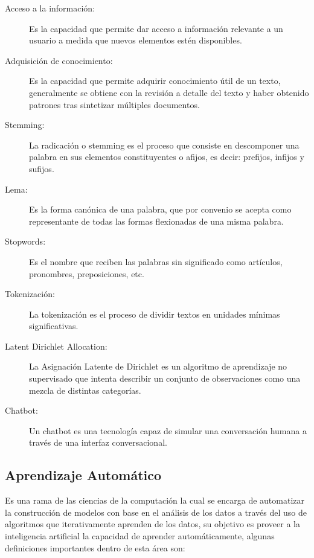            \begin{description}
                \item[Acceso a la información:] Es la capacidad que permite dar acceso a información relevante a un usuario a medida que nuevos elementos estén disponibles.
                \item[Adquisición de conocimiento:] Es la capacidad que permite adquirir conocimiento útil de un texto, generalmente se obtiene con la revisión a detalle del texto y haber obtenido patrones tras sintetizar múltiples documentos.
                \item[Stemming:] La radicación o stemming es el proceso que consiste en descomponer una palabra en sus elementos constituyentes o afijos, es decir: prefijos, infijos y sufijos.
                \item[Lema:] Es la forma canónica de una palabra, que por convenio se acepta como representante de todas las formas flexionadas de una misma palabra.
                \item[Stopwords:] Es el nombre que reciben las palabras sin significado como artículos, pronombres, preposiciones, etc.
                \item[Tokenización:] La tokenización es el proceso de dividir textos en unidades mínimas significativas.
                \item[Latent Dirichlet Allocation:] La Asignación Latente de Dirichlet es un algoritmo de aprendizaje no supervisado que intenta describir un conjunto de observaciones como una mezcla de distintas categorías.
                \item[Chatbot:] Un chatbot es una tecnología capaz de simular una conversación humana a través de una interfaz conversacional.
            \end{description}
            
        \subsection{Aprendizaje Automático}
        
        Es una rama de las ciencias de la computación la cual se encarga de automatizar la construcción de modelos con base en el análisis de los datos a través del uso de algoritmos que iterativamente aprenden de los datos, su objetivo es proveer a la inteligencia artificial la capacidad de aprender automáticamente, algunas definiciones importantes dentro de esta área son:
        
